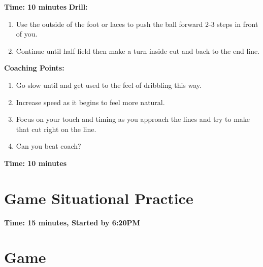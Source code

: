\documentclass[10pt,letterpaper]{article}
\newenvironment{oddBlock}[1]{%
    \tcolorbox[beamer,%
    noparskip,breakable,
    colback=LightBlue,colframe=DarkBlue,%
    colbacklower=DarkBlue!75!LightBlue,%
    title=#1]}%
    {\endtcolorbox}
\begin{document}
\textbf{Time: 10 minutes}
\begin{oddBlock}{Straight line dribbling at speed ( 10 min )}
    \textbf{Drill:}
    \begin{enumerate}
        \setlength{\itemsep}{0pt}
        \setlength{\parskip}{0pt}
        \setlength{\parsep}{0pt}
        \item Use the outside of the foot or laces to push the ball forward 2-3 steps in front of you.
        \item Continue until half field then make a turn inside cut and back to the end line.
    \end{enumerate}
    \textbf{Coaching Points:}
    \begin{enumerate}
        \setlength{\itemsep}{0pt}
        \setlength{\parskip}{0pt}
        \setlength{\parsep}{0pt}
        \item Go slow until and get used to the feel of dribbling this way.
        \item Increase speed as it begins to feel more natural.
        \item Focus on your touch and timing as you approach the lines and try to make that cut right on the line.
        \item Can you beat coach?
    \end{enumerate}
\end{oddBlock}

\textbf{Time: 10 minutes}


\clearpage
\section{Game Situational Practice}
\textbf{Time: 15 minutes, Started by 6:20PM}


%

%

\section{Game}
\end{document}
